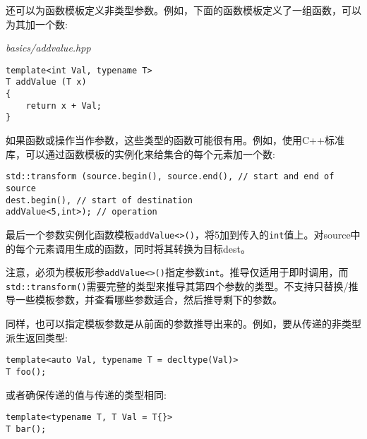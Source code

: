 还可以为函数模板定义非类型参数。例如，下面的函数模板定义了一组函数，可以为其加一个数:

\noindent
\textit{basics/addvalue.hpp}
\begin{lstlisting}[style=styleCXX]
template<int Val, typename T>
T addValue (T x)
{
	return x + Val;
}
\end{lstlisting}

如果函数或操作当作参数，这些类型的函数可能很有用。例如，使用C++标准库，可以通过函数模板的实例化来给集合的每个元素加一个数:

\begin{lstlisting}[style=styleCXX]
std::transform (source.begin(), source.end(), // start and end of source
dest.begin(), // start of destination
addValue<5,int>); // operation
\end{lstlisting}

最后一个参数实例化函数模板\texttt{addValue<>()}，将5加到传入的\texttt{int}值上。对source中的每个元素调用生成的函数，同时将其转换为目标dest。

注意，必须为模板形参\texttt{addValue<>()}指定参数\texttt{int}。推导仅适用于即时调用，而\texttt{std::transform()}需要完整的类型来推导其第四个参数的类型。不支持只替换/推导一些模板参数，并查看哪些参数适合，然后推导剩下的参数。

同样，也可以指定模板参数是从前面的参数推导出来的。例如，要从传递的非类型派生返回类型:

\begin{lstlisting}[style=styleCXX]
template<auto Val, typename T = decltype(Val)>
T foo();
\end{lstlisting}

或者确保传递的值与传递的类型相同:

\begin{lstlisting}[style=styleCXX]
template<typename T, T Val = T{}>
T bar();
\end{lstlisting}































